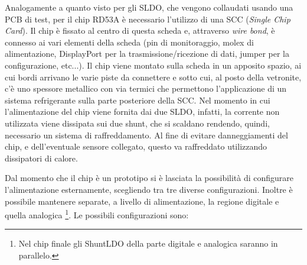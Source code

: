 Analogamente a quanto visto per gli SLDO, che vengono collaudati usando una PCB di test, per il chip RD53A è necessario l'utilizzo di una SCC (\textit{Single Chip Card}). 
Il chip è fissato al centro di questa scheda e, attraverso \textit{wire bond}, è connesso ai vari elementi della scheda (pin di monitoraggio, molex di alimentazione, DisplayPort per la trasmissione/ricezione di dati, jumper per la configurazione, etc...). 
Il chip viene montato sulla scheda in un apposito spazio, ai cui bordi arrivano le varie piste da connettere e sotto cui, al posto della vetronite, c'è uno spessore metallico con via termici che permettono l'applicazione di un sistema refrigerante sulla parte posteriore della SCC. 
Nel momento in cui l'alimentazione del chip viene fornita dai due SLDO, infatti, la corrente non utilizzata viene dissipata sui due shunt, che si scaldano rendendo, quindi, necessario un sistema di raffreddamento.
Al fine di evitare danneggiamenti del chip, e dell'eventuale sensore collegato, questo va raffreddato utilizzando dissipatori di calore. 

Dal momento che il chip è un prototipo si è lasciata la possibilità di configurare l'alimentazione esternamente, scegliendo tra tre diverse configurazioni.
Inoltre è possibile mantenere separate, a livello di alimentazione, la regione digitale e quella analogica
\footnote{
Nel chip finale gli ShuntLDO della parte digitale e analogica saranno in parallelo.
}.
Le possibili configurazioni sono:


